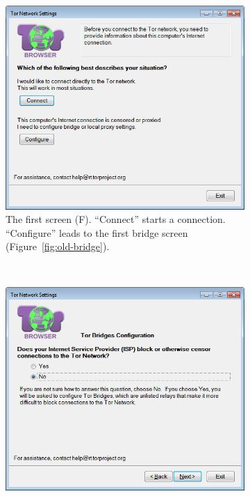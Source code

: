\documentclass[USenglish,oneside,twocolumn]{article}
\begin{document}
\begin{figure}
\centering
\begin{subfigure}[b]{0.30\textwidth}
	\includegraphics[width=\textwidth]{screenshots/OLD-first.png}
	\centering\captionsetup{width=1.5\linewidth}%
	\caption{The first screen (F). ``Connect'' starts a connection. ``Configure'' leads to the first bridge screen (Figure~\ref{fig:old-bridge}). }
	\label{fig:old-first}
\end{subfigure}
~~~~~~~~~~~~~~~~~~~~~~~~~
\begin{subfigure}[b]{0.30\textwidth}
	\includegraphics[width=\textwidth]{screenshots/OLD-bridges.png}

\end{subfigure}
\end{figure}
\end{document}
